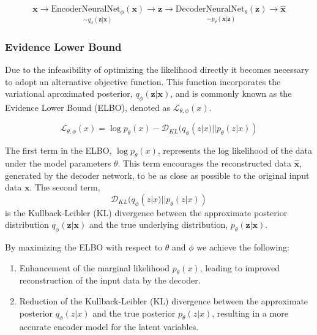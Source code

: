 \begin{equation}
    \mathbf{x}\rightarrow \underset{\sim q_\phi(\mathbf{z}|\mathbf{x})}{\text{EncoderNeuralNet}_\phi(\mathbf{x})} \rightarrow \mathbf{z} \rightarrow \underset{\sim p_\theta(\mathbf{x}|\mathbf{z})}{\text{DecoderNeuralNet}_\theta(\mathbf{z})} \rightarrow \hat{\mathbf{x}}
\end{equation}

\subsubsection{Evidence Lower Bound}
Due to the infeasibility of optimizing the likelihood directly it becomes necessary to adopt an alternative objective function. This function incorporates the variational aproximated posterior, $q_\phi(\mathbf{z}|\mathbf{x})$, and is commonly known as the Evidence Lower Bound (ELBO), denoted as $\mathcal{L}_{\theta, \phi}(x)$.

\begin{equation}
    \mathcal{L}_{\theta, \phi}(x) = \log p_\theta(x) - \mathcal{D}_{KL}(q_\phi(z|x) || p_\theta(z|x))
    \label{eq:ELBO}
\end{equation}

The first term in the ELBO, $\log p_\theta(x)$, represents the log likelihood of the data under the model parameters $\theta$. This term encourages the reconstructed data $\hat{\mathbf{x}}$, generated by the decoder network, to be as close as possible to the original input data $\mathbf{x}$.
The second term, 
\begin{equation}
\mathcal{D}_{KL}(q_\phi(z|x) || p_\theta(z|x))
\end{equation}
is the Kullback-Leibler (KL) divergence between the approximate posterior distribution $q_\phi(\mathbf{z}|\mathbf{x})$ and the true underlying distribution, $p_\theta(\mathbf{z}|\mathbf{x})$.

By maximizing the ELBO with respect to \( \theta \) and \( \phi \) we achieve the following:

\begin{enumerate}
    \item Enhancement of the marginal likelihood \( p_\theta(x) \), leading to improved reconstruction of the input data by the decoder.
    \item Reduction of the Kullback-Leibler (KL) divergence between the approximate posterior \( q_\phi(z|x) \) and the true posterior \( p_\theta(z|x) \), resulting in a more accurate encoder model for the latent variables.
\end{enumerate}

